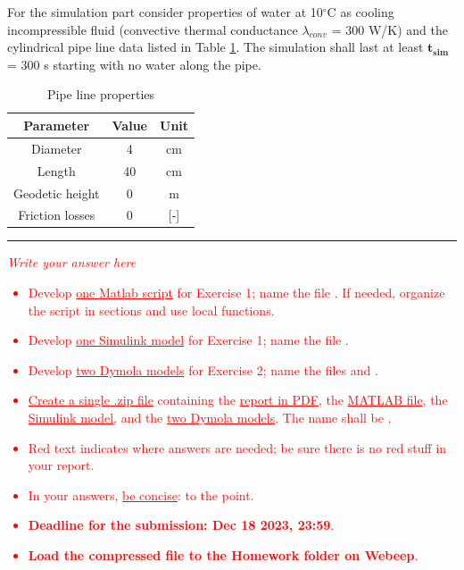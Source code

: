 \documentclass[11pt,a4paper,oneside]{article}
\newcommand{\tr}{\textcolor{red}}
\begin{document}
For the simulation part consider properties of water at 10$^{\circ}$C as cooling incompressible fluid (convective thermal conductance $\lambda_{conv}$ = 300 W/K) and the cylindrical pipe line data listed in Table \ref{tab:pipe}.
The simulation shall last at least $\mathbf{t_{sim}}$ = 300 s starting with no water along the pipe.

\begin{table}[ht!]
    \centering
    \caption{Pipe line properties}
    \begin{tabular}{ |c|c|c| } 
        \hline
        \textbf{Parameter} & \textbf{Value} & \textbf{Unit}\\
        \hline
        Diameter & 4 & cm  \\ 
        Length & 40 & cm  \\ 
        Geodetic height & 0 & m \\
        Friction losses & 0 & [-] \\ 
        \hline
    \end{tabular}
    \label{tab:pipe}
\end{table}

\medskip
\medskip \hrule \medskip
{}

\tr{\textit{Write your answer here}}






\clearpage
\tr{
\begin{itemize}
\item Develop \underline{one Matlab script} for Exercise 1; name the file . If needed, organize the script in sections and use local functions. 
\item Develop \underline{one Simulink model} for Exercise 1; name the file . 
\item Develop \underline{two Dymola models} for Exercise 2; name the files  and  . 
\item \underline{Create a single .zip file} containing the \underline{report in PDF}, the \underline{MATLAB file}, the \underline{Simulink model}, and the \underline{two Dymola models}. The name shall be .
\item Red text indicates where answers are needed; be sure there is no red stuff in your report.
\item In your answers, \underline{be concise}: to the point.
\item \textbf{Deadline for the submission: Dec 18 2023, 23:59}.
\item \textbf{Load the compressed file to the Homework folder on Webeep}.
\end{itemize}
}


\clearpage
\end{document}
